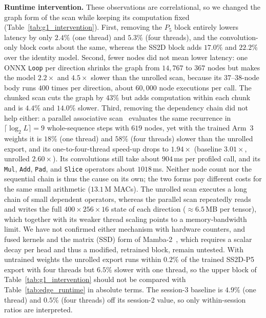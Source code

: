 \textbf{Runtime intervention.} These observations are correlational, so we changed the graph form of the scan while keeping its computation fixed (Table~\ref{tab:g1_intervention}). First, removing the $P_5$ block entirely lowers latency by only $2.4\%$ (one thread) and $5.3\%$ (four threads), and the convolution-only block costs about the same, whereas the SS2D block adds $17.0\%$ and $22.2\%$ over the identity model. Second, fewer nodes did not mean lower latency: one ONNX \texttt{Loop} per direction shrinks the graph from $14{,}767$ to $367$ nodes but makes the model $2.2\times$ and $4.5\times$ slower than the unrolled scan, because its $37$--$38$-node body runs $400$ times per direction, about $60{,}000$ node executions per call. The chunked scan cuts the graph by $43\%$ but adds computation within each chunk and is $4.4\%$ and $14.0\%$ slower. Third, removing the dependency chain did not help either: a parallel associative scan~\cite{blelloch1990prefix} evaluates the same recurrence in $\lceil \log_2 L \rceil = 9$ whole-sequence steps with $619$ nodes, yet with the trained Arm~3 weights it is $18\%$ (one thread) and $58\%$ (four threads) slower than the unrolled export, and its one-to-four-thread speed-up drops to $1.94\times$ (baseline $3.01\times$, unrolled $2.60\times$). Its convolutions still take about $904$\,ms per profiled call, and its \texttt{Mul}, \texttt{Add}, \texttt{Pad}, and \texttt{Slice} operators about $1018$\,ms. Neither node count nor the sequential chain is thus the cause on its own; the two forms pay different costs for the same small arithmetic ($13.1$\,M MACs). The unrolled scan executes a long chain of small dependent operators, whereas the parallel scan repeatedly reads and writes the full $400 \times 256 \times 16$ state of each direction ($\approx 6.5$\,MB per tensor), which together with its weaker thread scaling points to a memory-bandwidth limit. We have not confirmed either mechanism with hardware counters, and fused kernels and the matrix (SSD) form of Mamba-2~\cite{dao2024mamba2}, which requires a scalar decay per head and thus a modified, retrained block, remain untested. With untrained weights the unrolled export runs within $0.2\%$ of the trained SS2D-P5 export with four threads but $6.5\%$ slower with one thread, so the upper block of Table~\ref{tab:g1_intervention} should not be compared with Table~\ref{tab:edge_runtime} in absolute terms. The session-3 baseline is $4.9\%$ (one thread) and $0.5\%$ (four threads) off its session-2 value, so only within-session ratios are interpreted.

